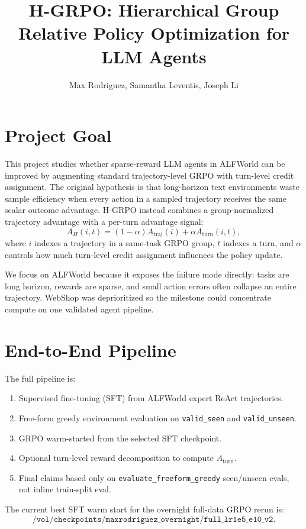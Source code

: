 \documentclass[10pt]{article}
\title{\vspace{-2.2em}\textbf{H-GRPO: Hierarchical Group Relative Policy Optimization for LLM Agents}}
\author{Max Rodriguez, Samantha Leventis, Joseph Li}
\date{}
\begin{document}
\maketitle
\vspace{-1.2em}

\section{Project Goal}
This project studies whether sparse-reward LLM agents in ALFWorld can be improved by augmenting standard trajectory-level GRPO with turn-level credit assignment. The original hypothesis is that long-horizon text environments waste sample efficiency when every action in a sampled trajectory receives the same scalar outcome advantage. H-GRPO instead combines a group-normalized trajectory advantage with a per-turn advantage signal:
\[
    A_H(i,t) = (1-\alpha) A_{\mathrm{traj}}(i) + \alpha A_{\mathrm{turn}}(i,t),
\]
where \(i\) indexes a trajectory in a same-task GRPO group, \(t\) indexes a turn, and \(\alpha\) controls how much turn-level credit assignment influences the policy update.

We focus on ALFWorld because it exposes the failure mode directly: tasks are long horizon, rewards are sparse, and small action errors often collapse an entire trajectory. WebShop was deprioritized so the milestone could concentrate compute on one validated agent pipeline.

\section{End-to-End Pipeline}
The full pipeline is:
\begin{enumerate}
    \item Supervised fine-tuning (SFT) from ALFWorld expert ReAct trajectories.
    \item Free-form greedy environment evaluation on \texttt{valid\_seen} and \texttt{valid\_unseen}.
    \item GRPO warm-started from the selected SFT checkpoint.
    \item Optional turn-level reward decomposition to compute \(A_{\mathrm{turn}}\).
    \item Final claims based only on \texttt{evaluate\_freeform\_greedy} seen/unseen evals, not inline train-split eval.
\end{enumerate}

The current best SFT warm start for the overnight full-data GRPO rerun is:
\[
\texttt{/vol/checkpoints/maxrodriguez\_overnight/full\_lr1e5\_e10\_v2}.
\]
\end{document}
